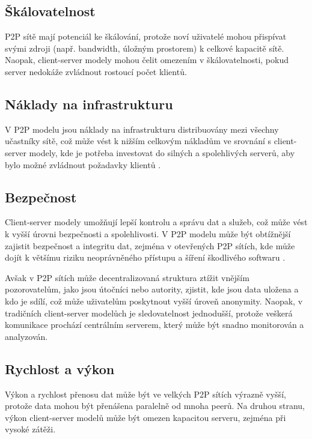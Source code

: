 \documentclass[10pt,twoside,czech,a4paper]{article}
\begin{document}
\subsection{Škálovatelnost}

P2P sítě mají potenciál ke škálování, protože noví uživatelé mohou přispívat svými zdroji (např. bandwidth, úložným prostorem) k celkové kapacitě sítě.
Naopak, client-server modely mohou čelit omezením v škálovatelnosti, pokud server nedokáže zvládnout rostoucí počet klientů.

\subsection{Náklady na infrastrukturu}

V P2P modelu jsou náklady na infrastrukturu distribuovány mezi všechny učastníky sítě, což může vést k nižším celkovým nákladům ve srovnání s client-server modely, kde je potřeba investovat do silných a spolehlivých serverů, aby bylo možné zvládnout požadavky klientů \cite{Leibnitz2007}.

\subsection{Bezpečnost}

Client-server modely umožňují lepší kontrolu a správu dat a služeb, což může vést k vyšší úrovni bezpečnosti a spolehlivosti.
V P2P modelu může být obtížnější zajistit bezpečnost a integritu dat, zejména v otevřených P2P sítích, kde může dojít k většímu riziku neoprávněného přístupu a šíření škodlivého softwaru \cite{Leibnitz2007}.

Avšak v P2P sítích může decentralizovaná struktura ztížit vnějším pozorovatelům, jako jsou útočníci nebo autority, zjistit, kde jsou data uložena a kdo je sdílí, což může uživatelům poskytnout vyšší úroveň anonymity.
Naopak, v tradičních client-server modelůch je sledovatelnost jednodušší, protože veškerá komunikace prochází centrálním serverem, který může být snadno monitorován a analyzován.

\subsection{Rychlost a výkon}

Výkon a rychlost přenosu dat může být ve velkých P2P sítích výrazně vyšší, protože data mohou být přenášena paralelně od mnoha peerů.
Na druhou stranu, výkon client-server modelů může být omezen kapacitou serveru, zejména při vysoké zátěži.
\end{document}
